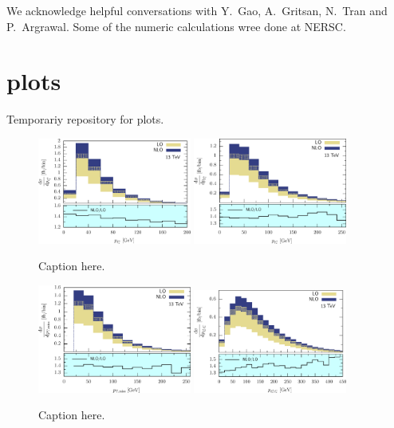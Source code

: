 \documentclass[preprint]{JHEP3} %
\begin{document}


\acknowledgments
We acknowledge helpful conversations with Y.~Gao, A.~Gritsan, N.~Tran and P.~Argrawal. 
Some of the numeric calculations wree done at NERSC.


\appendix
\section{plots}
Temporariy repository for plots.


\begin{figure}[h]
\centering %
\includegraphics[width=0.45\textwidth]{./LHC_53_Fig01.eps}
\hfill
\includegraphics[width=0.45\textwidth]{./LHC_53_Fig03.eps}
\caption{\label{fig:i} Caption here.}
\end{figure}


\begin{figure}[h]
\centering %
\includegraphics[width=0.45\textwidth]{./LHC_53_Fig08.eps}
\hfill
\includegraphics[width=0.45\textwidth]{./LHC_53_Fig12.eps}
\caption{\label{fig:i} Caption here.}
\end{figure}
\end{document}
